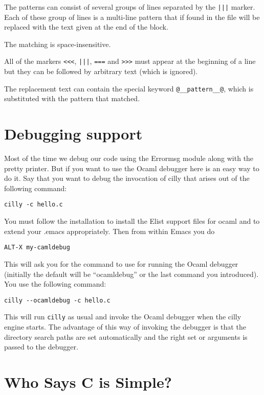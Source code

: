 \documentclass{article}
\def\t#1{{\tt #1}}
\begin{document}
 The patterns can consist of several groups of lines separated by the \t{|||}
marker. Each of these group of lines is a multi-line pattern that if found in
the file will be replaced with the text given at the end of the block. 

 The matching is space-insensitive.

 All of the markers \t{<<<}, \t{|||}, \t{===} and \t{>>>} must appear at the
beginning of a line but they can be followed by arbitrary text (which is
ignored).

 The replacement text can contain the special keyword \t{@\_\_pattern\_\_@},
which is substituted with the pattern that matched. 


\section{Debugging support}\label{sec-debugger}

 Most of the time we debug our code using the Errormsg module along with the
pretty printer. But if you want to use the Ocaml debugger here is an easy way
to do it. Say that you want to debug the invocation of cilly that arises out
of the following command:
\begin{verbatim}
cilly -c hello.c 
\end{verbatim}

 You must follow the installation 
to install the Elist support files for ocaml and to extend your .emacs
appropriately. Then from within Emacs you do
\begin{verbatim}
ALT-X my-camldebug
\end{verbatim}

 This will ask you for the command to use for running the Ocaml debugger
(initially the default will be ``ocamldebug'' or the last command you
introduced). You use the following command:
\begin{verbatim}
cilly --ocamldebug -c hello.c 
\end{verbatim}

 This will run \t{cilly} as usual and invoke the Ocaml debugger when the cilly
engine starts. The advantage of this way of invoking the debugger is that the
directory search paths are set automatically and the right set or arguments is
passed to the debugger. 


\section{Who Says C is Simple?}\label{sec-simplec}
\end{document}
